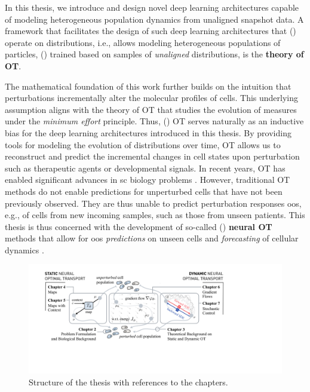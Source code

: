 In this thesis, we introduce and design novel deep learning architectures capable of modeling heterogeneous population dynamics from unaligned snapshot data.
A framework that facilitates the design of such deep learning architectures that () operate on distributions, i.e., allows modeling heterogeneous populations of particles, () trained based on samples of \emph{unaligned} distributions, is the \textbf{theory of \acrlong{OT}}.

The mathematical foundation of this work further builds on the intuition that perturbations incrementally alter the molecular profiles of cells. This underlying assumption aligns with the theory of \acrlong{OT} that studies the evolution of measures under the \emph{minimum effort} principle. Thus, () \acrshort{OT} serves naturally as an inductive bias for the deep learning architectures introduced in this thesis.
By providing tools for modeling the evolution of distributions over time, \acrshort{OT} allows us to reconstruct and predict the incremental changes in cell states upon perturbation such as therapeutic agents or developmental signals. 
In recent years, \acrshort{OT} has enabled significant advances in \acrlong{sc} biology problems \citep{schiebinger2019optimal, lavenant2021towards, demetci2022scot}. However, traditional \acrshort{OT} methods do not enable predictions for unperturbed cells that have not been previously observed.
They are thus unable to predict perturbation responses \acrlong{oos}, e.g., of cells from new incoming samples, such as those from unseen patients. 
This thesis is thus concerned with the development of so-called  () \textbf{neural \acrlong{OT}} methods that allow for \acrlong{oos} \emph{predictions} on unseen cells and \emph{forecasting} of cellular dynamics \citep{makkuva2020optimal, tong2020trajectorynet,  korotin2021wasserstein, bunne2022proximal, bunne2022supervised, bunne2021learning}. \\

\begin{figure}[t]
  \includegraphics[width=\textwidth]{figures/fig_overview_thesis.pdf}
  \caption{Structure of the thesis with references to the chapters.}
  \label{fig:overview_thesis}
\end{figure}

